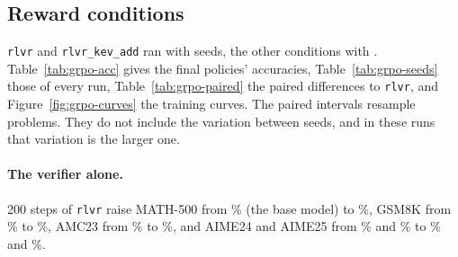 \subsection{Reward conditions}\label{sec:res-cond}

\texttt{rlvr} and \texttt{rlvr\_kev\_add} ran with  seeds, the other conditions with
. Table~\ref{tab:grpo-acc} gives the final policies' accuracies, Table~\ref{tab:grpo-seeds} those
of every run, Table~\ref{tab:grpo-paired} the paired differences to \texttt{rlvr}, and Figure~\ref{fig:grpo-curves} the
training curves. The paired intervals resample problems. They do not include the variation between seeds, and in these
runs that variation is the larger one.

\paragraph{The verifier alone.} 200 steps of \texttt{rlvr} raise MATH-500 from \% (the base model)
to \%, GSM8K from \% to \%, AMC23 from \% to
\%, and AIME24 and AIME25 from \% and \% to
\% and \%.

\begin{table}[t]
\centering\small

\caption{Final policies: accuracy in percent, seed mean $\pm$ standard deviation over seeds. MATH-500 and GSM8K
(1319 problems): greedy. AMC23, AIME24 and AIME25: mean over 16 samples per problem at temperature 0.6. Base model: the
mean of two evaluations.}
\label{tab:grpo-acc}
\end{table}

\begin{table}[t]
\centering\small

\caption{The final policy of every run: accuracy in percent, as in Table~\ref{tab:grpo-acc}.}
\label{tab:grpo-seeds}
\end{table}

